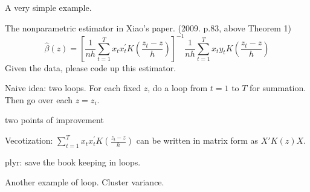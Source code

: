 \documentclass[11pt,english]{article}
\title{}
\author{Zhentao Shi}
\begin{document}
A very simple example.

The nonparametric estimator in Xiao's paper.
(2009. p.83, above Theorem 1)
\[
\hat{\beta}(z) = \left[ \frac{1}{nh} \sum_{t=1}^T x_t x_{t}^{\prime} K \left( \frac{z_t-z}{h} \right) \right]^{-1}
 \frac{1}{nh} \sum_{t=1}^T x_t y_t K \left( \frac{z_t - z}{h} \right) 
\]
Given the data, please code up this estimator.

Naive idea: two loops. For each fixed $z$, do a loop from $t=1$ to $T$ for summation. Then go over each $z = z_i$. 

two points of improvement

Vecotization: $\sum_{t=1}^T x_t x_{t}^{\prime} K \left( \frac{z_t-z}{h} \right)$ can be written in matrix form as $X' K(z) X$.

plyr: save the book keeping in loops.

Another example of loop. Cluster variance.
\end{document}
